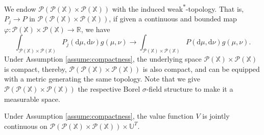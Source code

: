 \documentclass[11pt]{article}
\newcommand{\RR}{\mathbb{R}}
\newcommand{\XX}{\mathbb{X}}
\newcommand{\UU}{\mathbb{U}}
\newcommand{\cP}{\mathcal{P}}
\newcommand{\de}{\mathrm{d}} %
\begin{document}
We endow $\cP(\cP(\XX)\times\cP(\XX))$ with the induced weak\textsuperscript{$*$}-topology. That is, $P_j\to P$ in $\cP(\cP(\XX)\times\cP(\XX))$, if given a continuous and bounded map $\varphi:\cP(\XX)\times\cP(\XX)\to\RR$, we have
\begin{equation*}
    \int_{\cP(\XX)\times\cP(\XX)} P_j(\de\mu,\de\nu)g(\mu,\nu) \to \int_{\cP(\XX)\times\cP(\XX)} P(\de\mu,\de\nu)g(\mu,\nu).
\end{equation*}
Under Assumption \ref{assume:compactness}, the underlying space $\cP(\XX)\times\cP(\XX)$ is compact, thereby, $\cP(\cP(\XX)\times\cP(\XX))$ is also compact, and can be equipped with a metric generating the same topology. Note that we give $\cP(\cP(\XX)\times\cP(\XX))$ the respective Borel $\sigma$-field structure to make it a measurable space.

\begin{lemma}\label{lem:value-function-is-continuous}
    Under Assumption \ref{assume:compactness}, the value function $V$ is jointly continuous on $\cP(\cP(\XX)\times\cP(\XX))\times\UU^T$.
\end{lemma}
\end{document}
